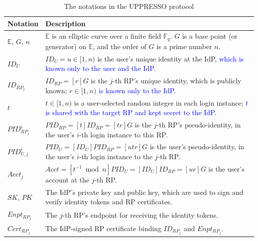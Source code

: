 \begin{table}[tb]
\footnotesize
    \caption{The notations in the UPPRESSO protocol}
    \centering
    \begin{tabular}{|p{1.0cm}|p{6.60cm}|} \hline
    {\textbf{Notation}} & {\textbf{Description}} \\ \hline
    {$\mathbb{E}$, $G$, $n$} & {$\mathbb{E}$ is an elliptic curve over a finite field $\mathbb{F}_q$. $G$ is a base point (or generator) on $\mathbb{E}$, and the order of $G$ is a prime number $n$.} \\ \hline
    {$ID_U$} & {$ID_U = u \in [1, n)$ is the user's unique identity at the IdP, \textcolor{blue}{which is known only to the user and the IdP. %
    }} \\ \hline
   {$ID_{RP_j}$} & {$ID_{RP} = [r]G$ is the $j$-th RP's unique identity, which is publicly known; $r \in [1, n)$ \textcolor{blue}{is known only to the IdP.}} \\ \hline
    {$t$} & {$t \in [1, n)$ is a user-selected random integer in each login instance; \textcolor{blue}{$t$ is shared with the target RP and kept secret to the IdP.
    }} \\ \hline
    {$PID_{RP_j}^i$} & {$PID_{RP} = [t]{ID_{RP}} = [tr]G$ is the $j$-th RP's pseudo-identity, in the user's $i$-th login instance to this RP.} \\ \hline
    {$PID_{U,j}^i$} & {$PID_U = [{ID_U}]{PID_{RP}} = [utr]G$ is the user's pseudo-identity, in the user's $i$-th login instance to the $j$-th RP.} \\ \hline
     {$Acct_j$} & {$Acct = [t^{-1}\bmod n]PID_{U} = [ID_U]ID_{RP} = [ur]G$ is the user's account at the $j$-th RP.} \\ \hline
    {$SK$, $PK$} & {The IdP's private key and public key, which are used to sign and verify identity tokens and RP certificates.} \\ \hline
    {$Enpt_{RP_j}$} & {The $j$-th RP's endpoint for receiving the identity tokens.} \\ \hline
    {$Cert_{RP_j}$} & {The IdP-signed RP certificate binding $ID_{RP_j}$ and $Enpt_{RP_j}$.} \\ \hline
    \end{tabular}
    \label{tbl:notations-protocol}
\end{table}

